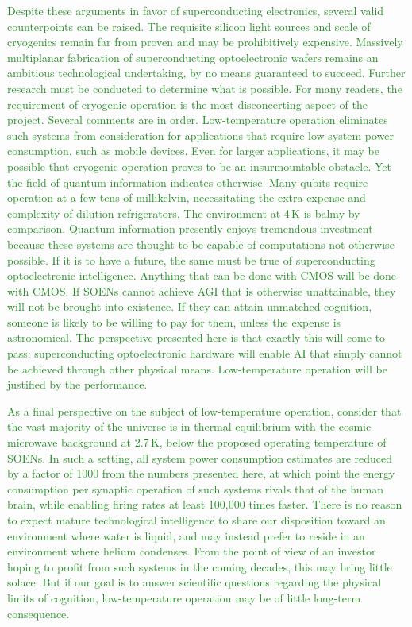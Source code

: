 \documentclass[twocolumn]{article}
\begin{document}
\textcolor{ForestGreen}{Despite these arguments in favor of superconducting electronics, several valid counterpoints can be raised. The requisite silicon light sources and scale of cryogenics remain far from proven and may be prohibitively expensive. Massively multiplanar fabrication of superconducting optoelectronic wafers remains an ambitious technological undertaking, by no means guaranteed to succeed. Further research must be conducted to determine what is possible. For many readers, the requirement of cryogenic operation is the most disconcerting aspect of the project. Several comments are in order. Low-temperature operation eliminates such systems from consideration for applications that require low system power consumption, such as mobile devices. Even for larger applications, it may be possible that cryogenic operation proves to be an insurmountable obstacle. Yet the field of quantum information indicates otherwise. Many qubits require operation at a few tens of millikelvin, necessitating the extra expense and complexity of dilution refrigerators. The environment at 4\,K is balmy by comparison. Quantum information presently enjoys tremendous investment because these systems are thought to be capable of computations not otherwise possible. If it is to have a future, the same must be true of superconducting optoelectronic intelligence. Anything that can be done with CMOS will be done with CMOS. If SOENs cannot achieve AGI that is otherwise unattainable, they will not be brought into existence. If they can attain unmatched cognition, someone is likely to be willing to pay for them, unless the expense is astronomical. The perspective presented here is that exactly this will come to pass: superconducting optoelectronic hardware will enable AI that simply cannot be achieved through other physical means. Low-temperature operation will be justified by the performance.}

\textcolor{ForestGreen}{As a final perspective on the subject of low-temperature operation, consider that the vast majority of the universe is in thermal equilibrium with the cosmic microwave background at 2.7\,K, below the proposed operating temperature of SOENs. In such a setting, all system power consumption estimates are reduced by a factor of 1000 from the numbers presented here, at which point the energy consumption per synaptic operation of such systems rivals that of the human brain, while enabling firing rates at least 100,000 times faster. There is no reason to expect mature technological intelligence to share our disposition toward an environment where water is liquid, and may instead prefer to reside in an environment where helium condenses. From the point of view of an investor hoping to profit from such systems in the coming decades, this may bring little solace. But if our goal is to answer scientific questions regarding the physical limits of cognition, low-temperature operation may be of little long-term consequence.}
\end{document}
